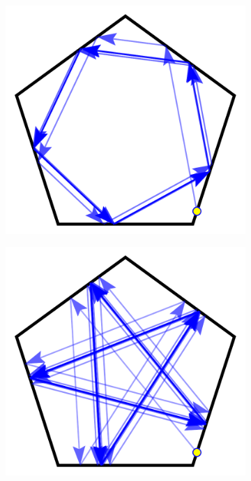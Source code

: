 \documentclass[letterpaper, 10 pt, conference]{ieeeconf}  %
\begin{document}
\begin{figure}[tp]
\begin{subfigure}{.25\textwidth}
\centering
\includegraphics[width=0.8\linewidth]{figs/pent_05rad.pdf}
\end{subfigure}%
\begin{subfigure}{0.25\textwidth}
\includegraphics[width=0.8\linewidth]{figs/pent_1rad.pdf}
\end{subfigure}
\begin{subfigure}{0.25\textwidth}

\end{subfigure}
\end{figure}
\end{document}
